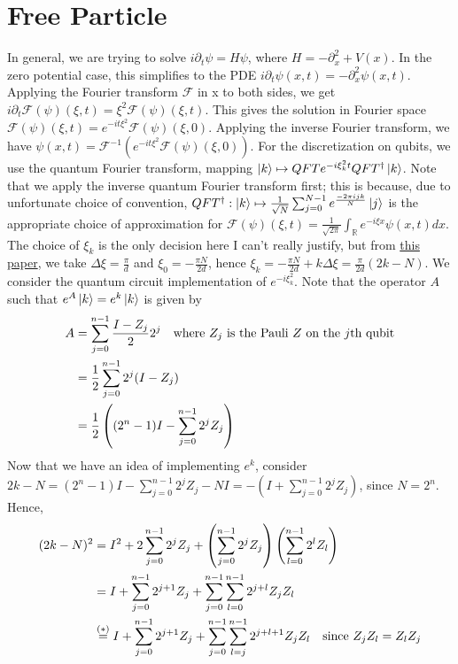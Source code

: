 \documentclass[10pt]{article}
\begin{document}
\section*{Free Particle}
In general, we are trying to solve $i \partial_t \psi = H \psi$, where 
$H = -\partial_x^2 + V(x)$. In the zero potential case, this simplifies to the PDE
$i \partial_t \psi(x, t) = -\partial_x^2 \psi(x, t)$. Applying the Fourier transform
$\mathcal{F}$ in x to both sides, we get $i \partial_t \mathcal{F}(\psi)(\xi, t) = \xi^2 \mathcal{F}(\psi)(\xi, t)$.
This gives the solution in Fourier space $\mathcal{F}(\psi)(\xi, t) = e^{-i t \xi^2}\mathcal{F}(\psi)(\xi, 0)$.
Applying the inverse Fourier transform, we have $\psi(x, t) = \mathcal{F}^{-1}\left(e^{-i t \xi^2} \mathcal{F}(\psi)(\xi, 0)\right)$.
For the discretization on qubits, we use the quantum Fourier transform, mapping
$\ket{k} \mapsto QFT e^{-i \xi_k^2 t} QFT^\dag \ket{k}$. Note that we apply
the inverse quantum Fourier transform first; this is because, due to unfortunate
choice of convention, $QFT^\dag: \ket{k} \mapsto \frac{1}{\sqrt{N}} \sum_{j=0}^{N-1} e^\frac{-2\pi ijk}{N} \ket{j}$
is the appropriate choice of approximation for $\mathcal{F}(\psi)(\xi, t) = \frac{1}{\sqrt{2\pi}}\int_{\mathbb{R}} e^{-i \xi x} \psi(x, t) dx$.
The choice of $\xi_k$ is the only decision here I can't really justify, but from \href{https://arxiv.org/pdf/1307.3318}{this paper},
we take $\Delta \xi = \frac{\pi}{d}$ and $\xi_0 = -\frac{\pi N}{2d}$, hence $\xi_k = -\frac{\pi N}{2d} + k \Delta \xi 
= \frac{\pi}{2d}(2k - N)$. 
\newline
We consider the quantum circuit implementation of $e^{-i \xi_k^2}$. Note that the
operator $A$ such that $e^A \ket{k} = e^k \ket{k}$ is given by
\begin{align*}
    A &= \sum_{j=0}^{n-1} \frac{I - Z_j}{2}2^j \text{\quad where $Z_j$ is the Pauli $Z$ on the $j$th qubit} \\
      &= \frac{1}{2} \sum_{j=0}^{n-1} 2^j(I - Z_j) \\
      &= \frac{1}{2}\left((2^n-1)I - \sum_{j=0}^{n-1} 2^j Z_j\right)
\end{align*}
Now that we have an idea of implementing $e^k$, consider $2k - N = (2^n - 1)I - \sum_{j=0}^{n-1} 2^j Z_j - NI
= -(I + \sum_{j=0}^{n-1}2^j Z_j)$, since $N = 2^n$. Hence,
\begin{align*}
    (2k-N)^2 &= I^2 + 2 \sum_{j=0}^{n-1} 2^j Z_j + \left( \sum_{j=0}^{n-1} 2^j Z_j \right) \left( \sum_{l=0}^{n-1} 2^l Z_l \right) \\
             &= I + \sum_{j=0}^{n-1} 2^{j+1} Z_j + \sum_{j=0}^{n-1} \sum_{l=0}^{n-1} 2^{j+l} Z_j Z_l \\
             &\overset{(*)}{=} I + \sum_{j=0}^{n-1} 2^{j+1} Z_j + \sum_{j=0}^{n-1} \sum_{l=j}^{n-1} 2^{j+l+1} Z_j Z_l \text{\quad since $Z_j Z_l = Z_l Z_j$}
\end{align*}
\end{document}
